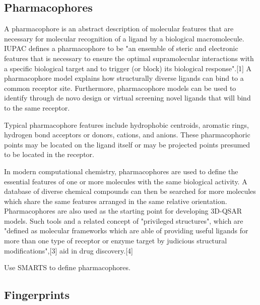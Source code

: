 \subsection{Pharmacophores}

A pharmacophore is an abstract description of molecular features that are necessary for molecular recognition of a ligand by a biological macromolecule. IUPAC defines a pharmacophore to be "an ensemble of steric and electronic features that is necessary to ensure the optimal supramolecular interactions with a specific biological target and to trigger (or block) its biological response".[1] A pharmacophore model explains how structurally diverse ligands can bind to a common receptor site. Furthermore, pharmacophore models can be used to identify through de novo design or virtual screening novel ligands that will bind to the same receptor.

Typical pharmacophore features include hydrophobic centroids, aromatic rings, hydrogen bond acceptors or donors, cations, and anions. These pharmacophoric points may be located on the ligand itself or may be projected points presumed to be located in the receptor.

In modern computational chemistry, pharmacophores are used to define the essential features of one or more molecules with the same biological activity. A database of diverse chemical compounds can then be searched for more molecules which share the same features arranged in the same relative orientation. Pharmacophores are also used as the starting point for developing 3D-QSAR models. Such tools and a related concept of "privileged structures", which are "defined as molecular frameworks which are able of providing useful ligands for more than one type of receptor or enzyme target by judicious structural modifications",[3] aid in drug discovery.[4]

Use SMARTS to define pharmacophores.
\subsection{Fingerprints}

